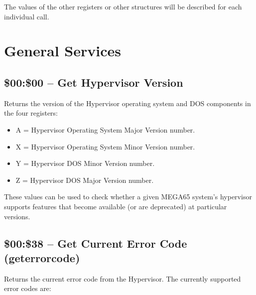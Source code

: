 The values of the other registers or other structures will be described for
each individual call.

\section{General Services}

\subsection{\$00:\$00 -- Get Hypervisor Version}

Returns the version of the Hypervisor operating system and DOS components in the
four registers:

\begin{itemize}
  \item A = Hypervisor Operating System Major Version number. 
  \item X = Hypervisor Operating System Minor Version number. 
  \item Y = Hypervisor DOS Minor Version number. 
  \item Z = Hypervisor DOS Major Version number. 
\end{itemize}

These values can be used to check whether a given MEGA65 system's hypervisor
supports features that become available (or are deprecated) at particular versions.

\subsection{\$00:\$38 -- Get Current Error Code (geterrorcode)}

Returns the current error code from the Hypervisor.  The currently supported
error codes are:

